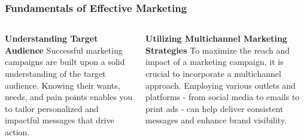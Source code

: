 \documentclass[5pt]{beamer}
\begin{document}
\begin{frame}
\frametitle{Fundamentals of Effective Marketing}
\begin{columns}
\begin{column}{0.45\textwidth}
\begin{block}{\textbf{Understanding Target Audience}}
Successful marketing campaigns are built upon a solid understanding of the target audience. Knowing their wants, needs, and pain points enables you to tailor personalized and impactful messages that drive action.
\end{block}
\end{column}
\begin{column}{0.45\textwidth}
\begin{block}{\textbf{Utilizing Multichannel Marketing Strategies}}
To maximize the reach and impact of a marketing campaign, it is crucial to incorporate a multichannel approach. Employing various outlets and platforms - from social media to emails to print ads - can help deliver consistent messages and enhance brand visibility.
\end{block}
\end{column}
\end{columns}
\end{frame}
\end{document}
